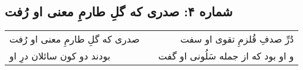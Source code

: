 \begin{center}
\section*{شماره ۴: صدری که گلِ طارمِ معنی او رُفت}
\label{sec:004}
\begin{longtable}{l p{0.5cm} r}
صدری که گلِ طارمِ معنی او رُفت
&&
دُرِّ صدفِ قُلزمِ تقوی او سفت
\\
بودند دو کون سائلان درِ او
&&
و او بود که از جمله سَلُونی او گفت
\\
\end{longtable}
\end{center}
